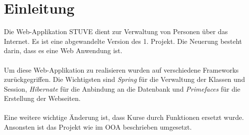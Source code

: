 \section{Einleitung}
Die Web-Applikation STUVE dient zur Verwaltung von Personen über das Internet. Es ist
eine abgewandelte Version des 1. Projekt. Die Neuerung besteht darin,
dass es eine Web Anwendung ist. \\
\\
Um diese Web-Applikation zu realisieren wurden auf verschiedene Frameworks zurückgegriffen. 
Die Wichtigsten sind \textit{Spring} für die Verwaltung der Klassen und Session, \textit{Hibernate} für die Anbindung an die Datenbank und \textit{Primefaces} für die Erstellung der Webseiten.\\
\\
Eine weitere wichtige Änderung ist, dass Kurse durch Funktionen ersetzt wurde. Ansonsten ist das Projekt wie im OOA beschrieben umgesetzt.\\
%
\newpage